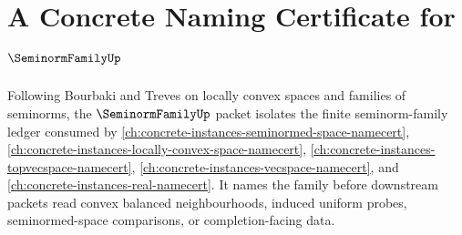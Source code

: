\chapter{A Concrete Naming Certificate for $\SeminormFamilyUp$}
\label{ch:concrete-instances-seminorm-family-namecert}

Following Bourbaki and Treves on locally convex spaces and families of seminorms, the $\SeminormFamilyUp$ packet isolates the finite seminorm-family ledger consumed by \autoref{ch:concrete-instances-seminormed-space-namecert}, \autoref{ch:concrete-instances-locally-convex-space-namecert}, \autoref{ch:concrete-instances-topvecspace-namecert}, \autoref{ch:concrete-instances-vecspace-namecert}, and \autoref{ch:concrete-instances-real-namecert}. It names the family before downstream packets read convex balanced neighbourhoods, induced uniform probes, seminormed-space comparisons, or completion-facing data.

